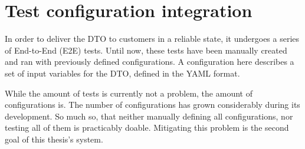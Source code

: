 \section{Test configuration integration}
\label{sec:introduction:test-configuration-integration}

In order to deliver the DTO to customers in a reliable state, it undergoes a series of End-to-End (E2E) tests.
Until now, these tests have been manually created and ran with previously defined configurations.
A configuration here describes a set of input variables for the DTO, defined in the YAML format.

While the amount of tests is currently not a problem, the amount of configurations is.
The number of configurations has grown considerably during its development.
So much so, that neither manually defining all configurations, nor testing all of them is practicably doable.
Mitigating this problem is the second goal of this thesis's system.


